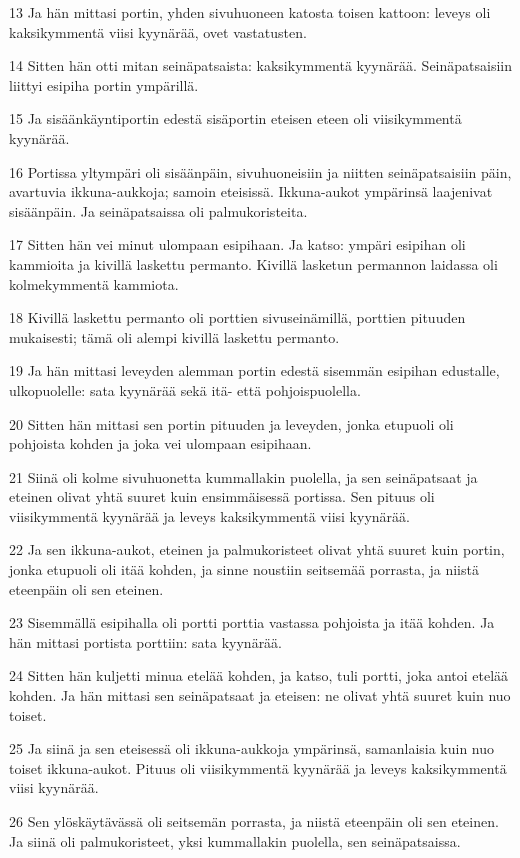 \par 13 Ja hän mittasi portin, yhden sivuhuoneen katosta toisen kattoon: leveys oli kaksikymmentä viisi kyynärää, ovet vastatusten.
\par 14 Sitten hän otti mitan seinäpatsaista: kaksikymmentä kyynärää. Seinäpatsaisiin liittyi esipiha portin ympärillä.
\par 15 Ja sisäänkäyntiportin edestä sisäportin eteisen eteen oli viisikymmentä kyynärää.
\par 16 Portissa yltympäri oli sisäänpäin, sivuhuoneisiin ja niitten seinäpatsaisiin päin, avartuvia ikkuna-aukkoja; samoin eteisissä. Ikkuna-aukot ympärinsä laajenivat sisäänpäin. Ja seinäpatsaissa oli palmukoristeita.
\par 17 Sitten hän vei minut ulompaan esipihaan. Ja katso: ympäri esipihan oli kammioita ja kivillä laskettu permanto. Kivillä lasketun permannon laidassa oli kolmekymmentä kammiota.
\par 18 Kivillä laskettu permanto oli porttien sivuseinämillä, porttien pituuden mukaisesti; tämä oli alempi kivillä laskettu permanto.
\par 19 Ja hän mittasi leveyden alemman portin edestä sisemmän esipihan edustalle, ulkopuolelle: sata kyynärää sekä itä- että pohjoispuolella.
\par 20 Sitten hän mittasi sen portin pituuden ja leveyden, jonka etupuoli oli pohjoista kohden ja joka vei ulompaan esipihaan.
\par 21 Siinä oli kolme sivuhuonetta kummallakin puolella, ja sen seinäpatsaat ja eteinen olivat yhtä suuret kuin ensimmäisessä portissa. Sen pituus oli viisikymmentä kyynärää ja leveys kaksikymmentä viisi kyynärää.
\par 22 Ja sen ikkuna-aukot, eteinen ja palmukoristeet olivat yhtä suuret kuin portin, jonka etupuoli oli itää kohden, ja sinne noustiin seitsemää porrasta, ja niistä eteenpäin oli sen eteinen.
\par 23 Sisemmällä esipihalla oli portti porttia vastassa pohjoista ja itää kohden. Ja hän mittasi portista porttiin: sata kyynärää.
\par 24 Sitten hän kuljetti minua etelää kohden, ja katso, tuli portti, joka antoi etelää kohden. Ja hän mittasi sen seinäpatsaat ja eteisen: ne olivat yhtä suuret kuin nuo toiset.
\par 25 Ja siinä ja sen eteisessä oli ikkuna-aukkoja ympärinsä, samanlaisia kuin nuo toiset ikkuna-aukot. Pituus oli viisikymmentä kyynärää ja leveys kaksikymmentä viisi kyynärää.
\par 26 Sen ylöskäytävässä oli seitsemän porrasta, ja niistä eteenpäin oli sen eteinen. Ja siinä oli palmukoristeet, yksi kummallakin puolella, sen seinäpatsaissa.
